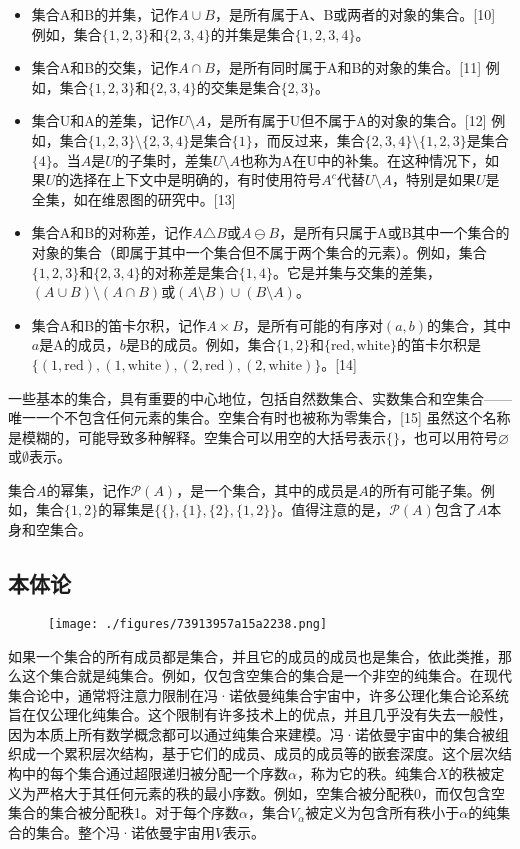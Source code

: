 \begin{itemize}
\item 集合A和B的并集，记作$A \cup B$，是所有属于A、B或两者的对象的集合。[10] 例如，集合$\{1, 2, 3\}$和$\{2, 3, 4\}$的并集是集合$\{1, 2, 3, 4\}$。
\item 集合A和B的交集，记作$A \cap B$，是所有同时属于A和B的对象的集合。[11] 例如，集合$\{1, 2, 3\}$和$\{2, 3, 4\}$的交集是集合$\{2, 3\}$。
\item 集合U和A的差集，记作$U \setminus A$，是所有属于U但不属于A的对象的集合。[12] 例如，集合$\{1, 2, 3\} \setminus \{2, 3, 4\}$是集合$\{1\}$，而反过来，集合$\{2, 3, 4\} \setminus \{1, 2, 3\}$是集合$\{4\}$。当$A$是$U$的子集时，差集$U \setminus A$也称为A在U中的补集。在这种情况下，如果$U$的选择在上下文中是明确的，有时使用符号$A^c$代替$U \setminus A$，特别是如果$U$是全集，如在维恩图的研究中。[13]
\item 集合A和B的对称差，记作$A \triangle B$或$A \ominus B$，是所有只属于A或B其中一个集合的对象的集合（即属于其中一个集合但不属于两个集合的元素）。例如，集合$\{1, 2, 3\}$和$\{2, 3, 4\}$的对称差是集合$\{1, 4\}$。它是并集与交集的差集，$(A \cup B) \setminus (A \cap B)$或$(A \setminus B) \cup (B \setminus A)$。
\item 集合A和B的笛卡尔积，记作$A \times B$，是所有可能的有序对$(a, b)$的集合，其中$a$是A的成员，$b$是B的成员。例如，集合$\{1, 2\}$和$\{\text{red}, \text{white}\}$的笛卡尔积是$\{(1, \text{red}), (1, \text{white}), (2, \text{red}), (2, \text{white})\}$。[14]
\end{itemize}
一些基本的集合，具有重要的中心地位，包括自然数集合、实数集合和空集合——唯一一个不包含任何元素的集合。空集合有时也被称为零集合，[15] 虽然这个名称是模糊的，可能导致多种解释。空集合可以用空的大括号表示$\{\}$，也可以用符号$\varnothing$或$\emptyset$表示。

集合$A$的幂集，记作${\mathcal {P}}(A)$，是一个集合，其中的成员是$A$的所有可能子集。例如，集合$\{1, 2\}$的幂集是$\{\{\}, \{1\}, \{2\}, \{1, 2\}\}$。值得注意的是，${\mathcal {P}}(A)$包含了$A$本身和空集合。
\subsection{本体论}
\begin{figure}[ht]
\centering
\texttt{[image: ./figures/73913957a15a2238.png]}
\caption{} \label{fig_Set1_6}
\end{figure}
如果一个集合的所有成员都是集合，并且它的成员的成员也是集合，依此类推，那么这个集合就是纯集合。例如，仅包含空集合的集合是一个非空的纯集合。在现代集合论中，通常将注意力限制在冯·诺依曼纯集合宇宙中，许多公理化集合论系统旨在仅公理化纯集合。这个限制有许多技术上的优点，并且几乎没有失去一般性，因为本质上所有数学概念都可以通过纯集合来建模。冯·诺依曼宇宙中的集合被组织成一个累积层次结构，基于它们的成员、成员的成员等的嵌套深度。这个层次结构中的每个集合通过超限递归被分配一个序数$\alpha$，称为它的秩。纯集合$X$的秩被定义为严格大于其任何元素的秩的最小序数。例如，空集合被分配秩0，而仅包含空集合的集合被分配秩1。对于每个序数$\alpha$，集合$V_{\alpha}$被定义为包含所有秩小于$\alpha$的纯集合的集合。整个冯·诺依曼宇宙用$V$表示。

